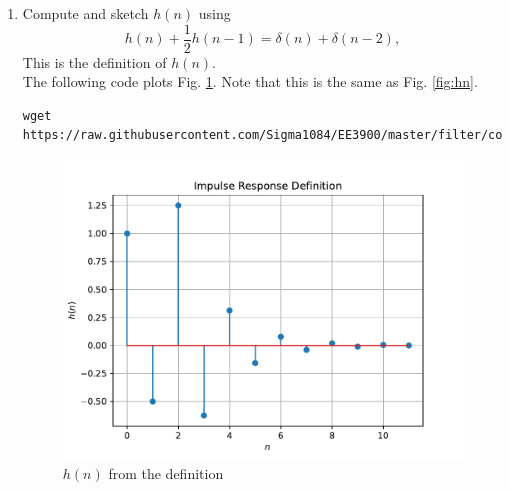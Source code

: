 \documentclass[journal,12pt,twocolumn]{IEEEtran}
\renewcommand\thesection{\arabic{section}}
\begin{document}
\begin{enumerate}[label=\thesection.\arabic*]
%
\item 
Compute and sketch $h(n)$ using 
\begin{equation}
\label{eq:iir_filter_h}
h(n) + \frac{1}{2}h(n-1) = \delta(n) + \delta(n-2), 
\end{equation}
%
This is the definition of $h(n)$.
\\
\solution The following code plots Fig. \ref{fig:hndef}. Note that this is the same as Fig. 
\ref{fig:hn}. 
%
\begin{lstlisting}
wget https://raw.githubusercontent.com/Sigma1084/EE3900/master/filter/code/Ex5_hndef.py
\end{lstlisting}
\begin{figure}[!ht]
\centering
\includegraphics[width=\columnwidth]{./figs/hndef}
\caption{$h(n)$ from the definition}
\label{fig:hndef}
\end{figure}
%


\end{enumerate}
\end{document}
